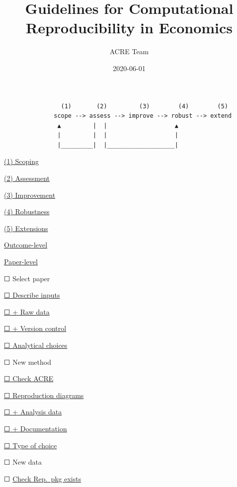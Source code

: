 \documentclass[]{book}
\title{Guidelines for Computational Reproducibility in Economics}
\author{ACRE Team}
\date{2020-06-01}
\begin{document}
\maketitle

{
\setcounter{tocdepth}{1}
\tableofcontents
}
\hypertarget{section}{%
\chapter*{}\label{section}}

\begin{verbatim}
                (1)       (2)         (3)        (4)        (5)
              scope --> assess --> improve --> robust --> extend
               ▲         |  |                   ▲
               |         |  |                   |
               |_________|  |___________________|
\end{verbatim}

\protect\hyperlink{scoping}{(1) Scoping}

\protect\hyperlink{assessment}{(2) Assessment}

\protect\hyperlink{improvements}{(3) Improvement}

\protect\hyperlink{robust}{(4) Robustness}

\href{}{(5) Extensions}

\protect\hyperlink{improvements}{Outcome-level}

\protect\hyperlink{paper-level}{Paper-level}

☐ Select paper

\protect\hyperlink{describe-inputs}{☐ Describe inputs}

\protect\hyperlink{rd}{☐ + Raw data}

\protect\hyperlink{paper-level}{☐ + Version control}

\protect\hyperlink{id-analy}{☐ Analytical choices}

☐ New method

\protect\hyperlink{check-acre}{☐ Check ACRE}

\protect\hyperlink{diagram}{☐ Reproduction diagrams}

\protect\hyperlink{ad}{☐ + Analysis data}

\protect\hyperlink{paper-level}{☐ + Documentation}

\protect\hyperlink{id-type}{☐ Type of choice}

☐ New data

☐ \protect\hyperlink{verify-rep-mat}{Check Rep.~pkg exists}
\end{document}
